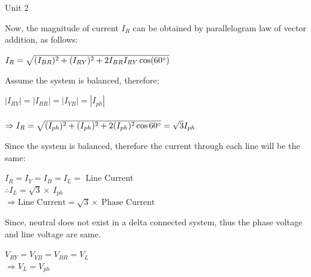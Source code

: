 \documentclass[11pt]{beamer}
\begin{document}
\begin{frame}[t,allowframebreaks]{Unit 2}
        \framebreak

        Now, the magnitude of current $I_R$ can be obtained by parallelogram law of vector addition, as follows:
        \begin{center}
            $I_R = \sqrt{(I_{BR})^2 + (I_{RY})^2 + 2 I_{BR} I_{RY} \cos(60\degree)}$
        \end{center}
        Assume the system is balanced, therefore:
        \begin{center}
            $|I_{RY}| = |I_{BR}| = |I_{YB}| = |I_{ph}|$
            \\~\\
            $\Rightarrow I_R = \sqrt {(I_{ph})^2 + (I_{ph})^2 + 2 (I_{ph})^2 \cos{60\degree}} = \sqrt{3} I_{ph}$
        \end{center}
        Since the system is balanced, therefore the current through each line will be the same:
        \begin{center}
            $I_R = I_Y = I_B = I_L =$ Line Current
            \\
            $\therefore I_L = \sqrt {3} \times~I_{ph}$
            \\
            $\Rightarrow \text{Line Current} = \sqrt{3} \times~\text{Phase Current}$
        \end{center}

        \framebreak

        Since, neutral does not exist in a delta connected system, thus the phase voltage and line voltage are same.
        \begin{center}
            $V_{RY} = V_{YB} = V_{BR} = V_L$\\
            $\Rightarrow V_L = V_{ph}$
        \end{center}

    \end{frame}
\end{document}
